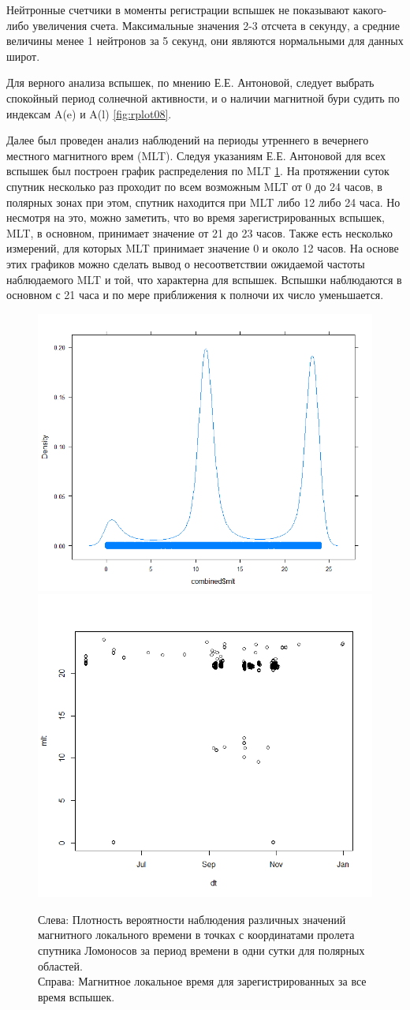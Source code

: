 Нейтронные счетчики в моменты регистрации вспышек не показывают какого-либо увеличения счета. Максимальные значения 2-3 отсчета в секунду, а средние величины менее 1 нейтронов за 5 секунд, они являются нормальными для данных широт. 

Для верного анализа вспышек, по мнению Е.Е. Антоновой, следует выбрать спокойный период солнечной активности, и о наличии магнитной бури судить по индексам A(e) и A(l) \ref{fig:rplot08}. 

Далее был проведен анализ наблюдений на периоды утреннего в вечернего местного магнитного врем (MLT). Следуя указаниям  Е.Е. Антоновой для всех вспышек был построен график распределения по MLT \ref{fig:rplot15}. На протяжении суток спутник несколько раз проходит по всем возможным MLT от 0 до 24 часов, в полярных зонах при этом, спутник находится при MLT либо 12 либо 24 часа. Но несмотря на это, можно заметить, что во время зарегистрированных вспышек, MLT,  в основном, принимает значение от 21 до 23 часов. Также есть несколько измерений, для которых MLT принимает значение 0 и около 12 часов. На основе этих графиков можно сделать вывод о несоответствии ожидаемой частоты наблюдаемого MLT и той, что характерна для вспышек. Вспышки наблюдаются в основном с 21 часа и по мере приближения к полночи их число уменьшается.


\begin{figure}
	\centering
	\includegraphics[width=0.49\linewidth]{images/Flash/Rplot020}
	\includegraphics[width=0.49\linewidth, trim={0 1cm 0 0}, clip]{images/Flash/Rplot14}
	\caption{Слева: Плотность вероятности наблюдения различных значений магнитного локального времени в точках с координатами пролета спутника Ломоносов за период времени в одни сутки для полярных областей. \\Справа: Магнитное локальное время для зарегистрированных за все время вспышек.}
	\label{fig:rplot15}
\end{figure}


